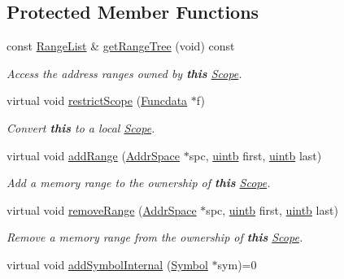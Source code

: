 \subsection*{Protected Member Functions}
\begin{DoxyCompactItemize}
\item 
const \mbox{\hyperlink{class_range_list}{Range\+List}} \& \mbox{\hyperlink{class_scope_ae9056f8ed8523a04a5ce8fa4afdd9419}{get\+Range\+Tree}} (void) const
\begin{DoxyCompactList}\small\item\em Access the address ranges owned by {\bfseries{this}} \mbox{\hyperlink{class_scope}{Scope}}. \end{DoxyCompactList}\item 
virtual void \mbox{\hyperlink{class_scope_a21556c257fbea888f9004c654599dfe9}{restrict\+Scope}} (\mbox{\hyperlink{class_funcdata}{Funcdata}} $\ast$f)
\begin{DoxyCompactList}\small\item\em Convert {\bfseries{this}} to a local \mbox{\hyperlink{class_scope}{Scope}}. \end{DoxyCompactList}\item 
virtual void \mbox{\hyperlink{class_scope_a33adf8d24b5e22aa420b840b817131e0}{add\+Range}} (\mbox{\hyperlink{class_addr_space}{Addr\+Space}} $\ast$spc, \mbox{\hyperlink{types_8h_a2db313c5d32a12b01d26ac9b3bca178f}{uintb}} first, \mbox{\hyperlink{types_8h_a2db313c5d32a12b01d26ac9b3bca178f}{uintb}} last)
\begin{DoxyCompactList}\small\item\em Add a memory range to the ownership of {\bfseries{this}} \mbox{\hyperlink{class_scope}{Scope}}. \end{DoxyCompactList}\item 
virtual void \mbox{\hyperlink{class_scope_ad1b4a9faa5d12ef3b0be55810dac6d35}{remove\+Range}} (\mbox{\hyperlink{class_addr_space}{Addr\+Space}} $\ast$spc, \mbox{\hyperlink{types_8h_a2db313c5d32a12b01d26ac9b3bca178f}{uintb}} first, \mbox{\hyperlink{types_8h_a2db313c5d32a12b01d26ac9b3bca178f}{uintb}} last)
\begin{DoxyCompactList}\small\item\em Remove a memory range from the ownership of {\bfseries{this}} \mbox{\hyperlink{class_scope}{Scope}}. \end{DoxyCompactList}\item 
virtual void \mbox{\hyperlink{class_scope_a66d3198f4bd28cf9e8a2a6bc00d065d8}{add\+Symbol\+Internal}} (\mbox{\hyperlink{class_symbol}{Symbol}} $\ast$sym)=0

\end{DoxyCompactItemize}
